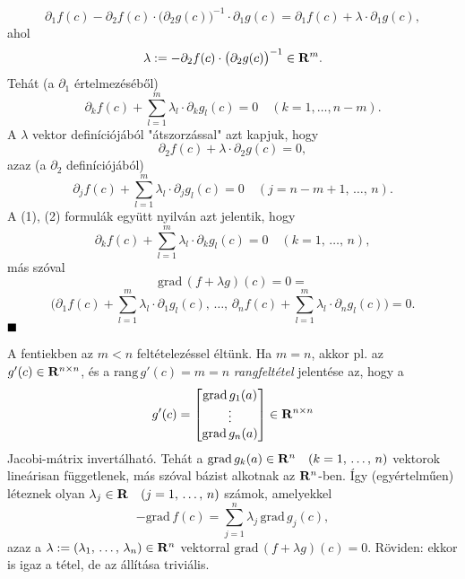 \[
	\partial_1f(c) - \partial_2f(c) \cdot \big( \partial_2 g(c) \big)^{-1} \cdot \partial_1g(c) = \partial_1f(c) + \lambda \cdot \partial_1g(c),
\]
ahol
\[
	\lambda := -\partial_2f(c) \cdot \big( \partial_2g(c) \big)^{-1} \in \mathbf{R}^m.
\]
Tehát (a $\partial_1$ értelmezéséből)
\begin{equation}
	\partial_k f(c) + \sum_{l=1}^{m} \lambda_l \cdot \partial_k g_l(c) = 0 \quad (k = 1, \dots, n - m).
	\label{eq:eq1}
\end{equation}
A $\lambda$ vektor definíciójából "átszorzással" azt kapjuk, hogy
\[
	\partial_2f(c) + \lambda \cdot \partial_2 g(c) = 0,
\]
azaz (a $\partial_2$ definíciójából)
\begin{equation}
	\partial_jf(c) + \sum_{l=1}^m \lambda_l \cdot \partial_j g_l(c) = 0 \quad (j = n-m+1, \, \dots, \, n).
	\label{eq:eq2}
\end{equation}
A (1), (2) formulák együtt nyilván azt jelentik, hogy
\[
	\partial_kf(c) + \sum_{l=1}^m \lambda_l \cdot \partial_k g_l(c) = 0 \quad (k = 1, \, \dots, \, n),
\]
más szóval
\[
	\text{grad} \, (f + \lambda g)(c) = 0 =
\]
\[
	\Big( \partial_1f(c) + \sum_{l=1}^m \lambda_l \cdot \partial_1 g_l(c), \, \dots, \, \partial_nf(c) + \sum_{l=1}^m \lambda_l \cdot \partial_n g_l(c) \Big) = 0. 
\]
$\hfill \blacksquare$

A fentiekben az $m < n$ feltételezéssel éltünk. Ha $m = n$, akkor pl. az $g'(c) \in \mathbf{R}^{n \times n}$, és a $\text{rang} \, g'(c) = m = n$ \textit{rangfeltétel} jelentése az, hogy a
\[
g'(c) = \begin{bmatrix}
	\text{grad} \, g_1(a) \\
	\vdots \\
	\text{grad} \, g_n(a) \\
\end{bmatrix} \in \mathbf{R}^{n \times n}
\]
Jacobi-mátrix invertálható. Tehát a $\text{grad} \, g_k(a) \in \mathbf{R}^n \quad (k = 1, \, \dots, \, n)$ vektorok lineárisan függetlenek, más szóval bázist alkotnak az $\mathbf{R}^n$-ben. Így (egyértelműen) léteznek olyan $\lambda_j \in \mathbf{R} \quad (j = 1, \, \dots, \, n)$ számok, amelyekkel
\[
- \text{grad} \, f(c) = \sum_{j=1}^n \lambda_j \, \text{grad} \, g_j(c),
\]
azaz a $\lambda := (\lambda_1, \, \dots, \, \lambda_n) \in \mathbf{R}^n$ vektorral $\text{grad} \, (f + \lambda g)(c) = 0$. Röviden: ekkor is igaz a tétel, de az állítása triviális.\\

